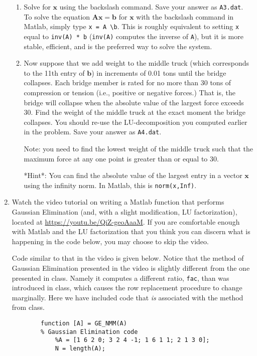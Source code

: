 \documentclass[]{article}
\newcommand{\x}{\bm{x}}					%
\newcommand{\A}{\bm{A}}					%
\begin{document}
\begin{enumerate}[resume]
\begin{enumerate}
		\item Solve for $\x$ using the backslash command.  Save your answer as \texttt{A3.dat}. To solve the equation $\A\x=\bm{b}$ for $\x$ with the backslash command in Matlab, simply type \texttt{x = A \textbackslash b}. This is roughly equivalent to setting \texttt{x} equal to \texttt{inv(A) * b} (\texttt{inv(A)} computes the inverse of \texttt{A}), but it is more stable, efficient, and is the preferred way to solve the system.

		\item Now suppose that we add weight to the middle truck (which corresponds to the 11th entry of $\bm{b}$) in increments of 0.01 tons until the bridge collapses.  Each bridge member is rated for no more than 30 tons of compression or tension (i.e., positive or negative forces.)  That is, the bridge will collapse when the absolute value of the largest force exceeds 30. Find the weight of the middle truck at the exact moment the bridge collapses. You should re-use the LU-decomposition you computed earlier in the problem. Save your answer as \texttt{A4.dat}.

		Note: you need to find the lowest weight of the middle truck such that the maximum force at any one point is greater than or equal to 30.  

		*Hint*: You can find the absolute value of the largest entry in a vector $\x$ using the infinity norm. In Matlab, this is \texttt{norm(x,Inf)}. 
	\end{enumerate}


	\item Watch the video tutorial on writing a Matlab function that performs Gaussian Elimination (and, with a slight modification, LU factorization), located at \url{https://youtu.be/QiZ-geoAaaM}. If you are comfortable enough with Matlab and the LU factorization that you think you can discern what is happening in the code below, you may choose to skip the video.

	Code similar to that in the video is given below. Notice that the method of Gaussian Elimination presented in the video is slightly different from the one presented in class. Namely it computes a different ratio, \texttt{fac}, than was introduced in class, which causes the row replacement procedure to change marginally. Here we have included code that \textit{is} associated with the method from class.

	\begin{verbatim}
		function [A] = GE_NMM(A)
		% Gaussian Elimination code
			%A = [1 6 2 0; 3 2 4 -1; 1 6 1 1; 2 1 3 0];
			N = length(A);


\end{verbatim}
\end{enumerate}
\end{document}
